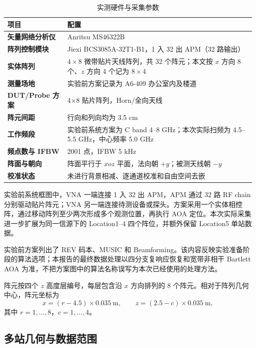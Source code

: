 \documentclass[UTF8,12pt,a4paper]{ctexart}
\begin{document}
\begin{table}[H]
  \centering
  \caption{实测硬件与采集参数}
  \label{tab:hardware}
  \begin{tabularx}{\textwidth}{>{\bfseries}p{}X}
    \toprule
    项目 & 配置 \\
    \midrule
    矢量网络分析仪 & Anritsu MS46322B \\
    阵列控制模块 & Jiexi BCS3085A-32T1-B1，1 入 32 出 APM（32 路输出） \\
    实体阵列 & $4\times8$ 微带贴片天线阵列，共 32 个阵元；本文按 $x$ 方向 8 个、$z$ 方向 4 个记为 $8\times4$ \\
    测量场地 & 实验前方案记录为 A6-409 办公室内及楼道 \\
    DUT/Probe 方案 & 4×8 贴片阵列，Horn/全向天线 \\
    阵元间距 & 行向和列向均为 3.5 cm \\
    工作频段 & 实验前系统方案为 C band 4--8 GHz；本次实际扫频为 4.5--5.5 GHz，中心频率 5.0 GHz \\
    频点数与 IFBW & 2001 点，IFBW 5 kHz \\
    阵面与朝向 & 阵面平行于 $xoz$ 平面，法向朝 $+y$；被测天线朝 $-y$ \\
    校准状态 & 未进行背景相减、逐通道校准和自由空间去嵌 \\
    \bottomrule
  \end{tabularx}
\end{table}

实验前系统框图中，VNA 一端连接 1 入 32 出 APM，APM 通过 32 路 RF chain 分别驱动贴片阵元；VNA 另一端连接待测设备或探头。方案采用一个实体相控阵，通过移动阵列至少两次形成多个观测位置，再执行 AOA 定位。本次实际采集进一步扩展为同一信源下的 Location1--4 四个阵位，并额外保留 Location5 单站数据。

实验前方案列出了 REV 码本、MUSIC 和 Beamforming。该内容反映实验准备阶段的算法选项；本报告的最终数据处理以四分支复响应恢复和宽带非相干 Bartlett AOA 为准，不把方案图中的算法名称误写为本次已经使用的处理方法。

阵元按四个 $z$ 高度层编号，每层包含沿 $x$ 方向排列的 8 个阵元。相对于阵列几何中心，阵元坐标为
\begin{equation}
  x=(r-4.5)\times 0.035\ \mathrm{m},\qquad
  z=(2.5-c)\times 0.035\ \mathrm{m},
\end{equation}
其中 $r=1,\ldots,8$，$c=1,\ldots,4$。

\subsection{多站几何与数据范围}
\end{document}
